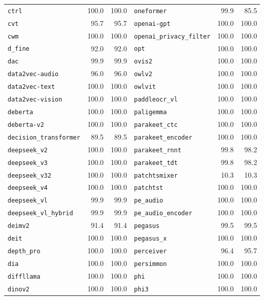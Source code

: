 \begin{longtable}{@{}lrr@{\hspace{24pt}}lrr@{}}
\texttt{ctrl} & 100.0 & 100.0 & \texttt{oneformer} & 99.9 & 85.5 \\
\texttt{cvt} & 95.7 & 95.7 & \texttt{openai-gpt} & 100.0 & 100.0 \\
\texttt{cwm} & 100.0 & 100.0 & \texttt{openai\_privacy\_filter} & 100.0 & 100.0 \\
\texttt{d\_fine} & 92.0 & 92.0 & \texttt{opt} & 100.0 & 100.0 \\
\texttt{dac} & 99.9 & 99.9 & \texttt{ovis2} & 100.0 & 100.0 \\
\texttt{data2vec-audio} & 96.0 & 96.0 & \texttt{owlv2} & 100.0 & 100.0 \\
\texttt{data2vec-text} & 100.0 & 100.0 & \texttt{owlvit} & 100.0 & 100.0 \\
\texttt{data2vec-vision} & 100.0 & 100.0 & \texttt{paddleocr\_vl} & 100.0 & 100.0 \\
\texttt{deberta} & 100.0 & 100.0 & \texttt{paligemma} & 100.0 & 100.0 \\
\texttt{deberta-v2} & 100.0 & 100.0 & \texttt{parakeet\_ctc} & 100.0 & 100.0 \\
\texttt{decision\_transformer} & 89.5 & 89.5 & \texttt{parakeet\_encoder} & 100.0 & 100.0 \\
\texttt{deepseek\_v2} & 100.0 & 100.0 & \texttt{parakeet\_rnnt} & 99.8 & 98.2 \\
\texttt{deepseek\_v3} & 100.0 & 100.0 & \texttt{parakeet\_tdt} & 99.8 & 98.2 \\
\texttt{deepseek\_v32} & 100.0 & 100.0 & \texttt{patchtsmixer} & 10.3 & 10.3 \\
\texttt{deepseek\_v4} & 100.0 & 100.0 & \texttt{patchtst} & 100.0 & 100.0 \\
\texttt{deepseek\_vl} & 99.9 & 99.9 & \texttt{pe\_audio} & 100.0 & 100.0 \\
\texttt{deepseek\_vl\_hybrid} & 99.9 & 99.9 & \texttt{pe\_audio\_encoder} & 100.0 & 100.0 \\
\texttt{deimv2} & 91.4 & 91.4 & \texttt{pegasus} & 99.5 & 99.5 \\
\texttt{deit} & 100.0 & 100.0 & \texttt{pegasus\_x} & 100.0 & 100.0 \\
\texttt{depth\_pro} & 100.0 & 100.0 & \texttt{perceiver} & 96.4 & 95.7 \\
\texttt{dia} & 100.0 & 100.0 & \texttt{persimmon} & 100.0 & 100.0 \\
\texttt{diffllama} & 100.0 & 100.0 & \texttt{phi} & 100.0 & 100.0 \\
\texttt{dinov2} & 100.0 & 100.0 & \texttt{phi3} & 100.0 & 100.0 \\

\end{longtable}
